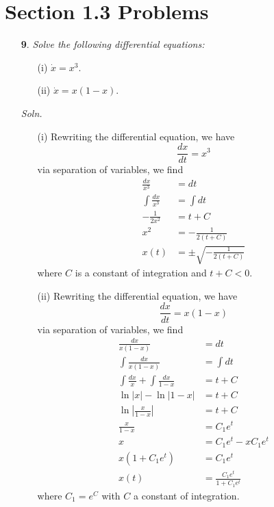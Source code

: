 \documentclass{article}
\begin{document}
\section*{Section 1.3 Problems}
\begin{itemize}
    \item[\textbf{9}.] \textit{Solve the following differential equations:}
    \begin{itemize}
        \item[(i)] $\dot{x} = x^3$.
        

        \item[(ii)] $\dot{x} = x(1-x)$.
    \end{itemize}

    \textit{Soln.}
    \begin{itemize}
        \item[(i)] Rewriting the differential equation, we have
        \[\frac{dx}{dt} = x^3\]
        via separation of variables, we find
        \begin{align*}
            \frac{dx}{x^3} &= dt\\
            \int\frac{dx}{x^3} &= \int dt\\
            -\frac{1}{2x^2} &= t + C\\
            x^2 &= -\frac{1}{2(t + C)}\\
            x(t) &= \pm \sqrt{-\frac{1}{2(t + C)}}
        \end{align*}
        where $C$ is a constant of integration and $t + C < 0$.

        \item[(ii)] Rewriting the differential equation, we have
        \[\frac{dx}{dt} = x(1-x)\]
        via separation of variables, we find
        \begin{align*}
            \frac{dx}{x(1-x)} &= dt\\
            \int\frac{dx}{x(1-x)} &= \int dt\\
            \int\frac{dx}{x} + \int\frac{dx}{1-x} &= t + C\\
            \ln|x| - \ln|1-x| &= t + C\\
            \ln\left|\frac{x}{1-x}\right| &= t + C\\
            \frac{x}{1-x} &= C_1e^t\\
            x &= C_1e^t - xC_1e^t\\
            x(1 + C_1e^t) &= C_1e^t\\
            x(t) &= \frac{C_1e^t}{1 + C_1e^t}
        \end{align*}
        where $C_1 = e^C$ with $C$ a constant of integration.
    \end{itemize}
    

\end{itemize}
\end{document}
